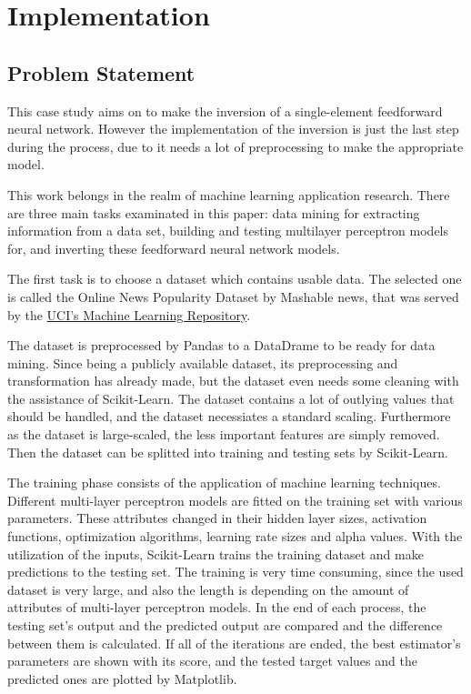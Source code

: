 \chapter{Implementation}

\section{Problem Statement}

This case study aims on to make the inversion of a single-element feedforward neural network. However the implementation of the inversion is just the last step during the process, due to it needs a lot of preprocessing to make the appropriate model.\medskip

This work belongs in the realm of machine learning application research. There are three main tasks examinated in this paper: data mining for extracting information from a data set, building and testing multilayer perceptron models for, and inverting these feedforward neural network models. \bigskip

The first task is to choose a dataset which contains usable data. The selected one is called the Online News Popularity Dataset by Mashable news, that was served by the  \href{http://archive.ics.uci.edu/ml/datasets/Online+News+Popularity}{UCI's Machine Learning Repository}. \smallskip

The dataset is preprocessed by Pandas to a DataDrame to be ready for data mining. Since being a publicly available dataset, its preprocessing and transformation has already made, but the dataset even needs some cleaning with the assistance of Scikit-Learn. The dataset contains a lot of outlying values that should be handled, and the dataset necessiates a standard scaling. Furthermore as the dataset is large-scaled, the less important features are simply removed. Then the dataset can be splitted into training and testing sets by Scikit-Learn. \medskip

The training phase consists of the application of machine learning techniques. Different multi-layer perceptron models are fitted on the training set with various parameters. These attributes changed in their hidden layer sizes, activation functions, optimization algorithms, learning rate sizes and alpha values. With the utilization of the inputs, Scikit-Learn trains the training dataset and make predictions to the testing set. The training is very time consuming, since the used dataset is very large, and also the length is depending on the amount of attributes of multi-layer perceptron models. In the end of each process, the testing set's output and the predicted output are compared and the difference between them is calculated. If all of the iterations are ended, the best estimator's parameters are shown with its score, and the tested target values and the predicted ones are plotted by Matplotlib.\medskip

